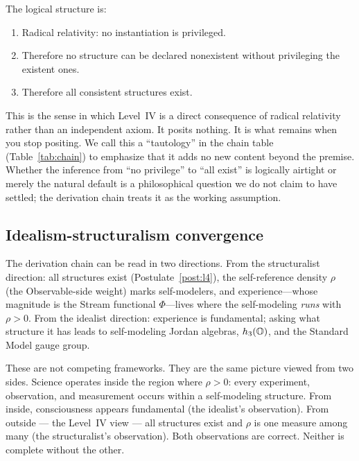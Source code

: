 The logical structure is:
\begin{enumerate}[nosep]
\item Radical relativity: no instantiation is privileged.
\item Therefore no structure can be declared nonexistent without
  privileging the existent ones.
\item Therefore all consistent structures exist.
\end{enumerate}

This is the sense in which Level~IV is a direct consequence of radical
relativity rather than an independent axiom.  It posits nothing.  It
is what remains when you stop positing.  We call this a ``tautology''
in the chain table (Table~\ref{tab:chain}) to emphasize that it adds
no new content beyond the premise.  Whether the inference from ``no
privilege'' to ``all exist'' is logically airtight or merely the
natural default is a philosophical question we do not claim to have
settled; the derivation chain treats it as the working assumption.

\subsection{Idealism-structuralism convergence}
\label{subsec:idealism}

The derivation chain can be read in two directions.  From the
structuralist direction: all structures exist (Postulate~\ref{post:l4}),
the self-reference density $\rho$ (the Observable-side weight) marks
self-modelers, and experience---whose magnitude is the Stream
functional $\Phi$---lives where the self-modeling \emph{runs} with
$\rho > 0$.  From the idealist direction: experience is
fundamental; asking what structure it has leads to self-modeling Jordan
algebras, $h_3(\mathbb{O})$, and the Standard Model gauge group.

These are not competing frameworks.  They are the same picture viewed
from two sides.  Science operates inside the region where $\rho > 0$:
every experiment, observation, and measurement occurs within a
self-modeling structure.  From inside, consciousness appears
fundamental (the idealist's observation).  From outside --- the
Level~IV view --- all structures exist and $\rho$ is one measure among
many (the structuralist's observation).  Both observations are
correct.  Neither is complete without the other.
